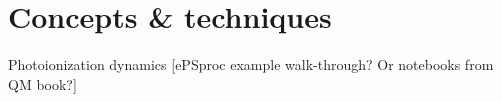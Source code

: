 \section{Concepts \& techniques}

Photoionization dynamics [ePSproc example walk-through? Or notebooks from QM book?]